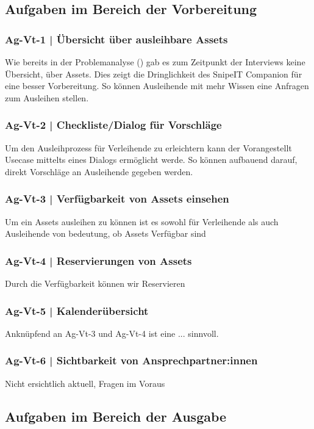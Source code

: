 
\subsection*{Aufgaben im Bereich der Vorbereitung}
\subsubsection*{Ag-Vt-1 | Übersicht über ausleihbare Assets}
Wie bereits in der Problemanalyse () gab es zum Zeitpunkt der Interviews keine Übersicht, über
Assets. Dies zeigt die Dringlichkeit des SnipeIT Companion für eine besser Vorbereitung. So
können Ausleihende mit mehr Wissen eine Anfragen zum Ausleihen stellen. 
\subsubsection*{Ag-Vt-2 | Checkliste/Dialog für Vorschläge}
Um den Ausleihprozess für Verleihende zu erleichtern kann der Vorangestellt Usecase mittelts eines
Dialogs ermöglicht werde. So können aufbauend darauf, direkt Vorschläge an Ausleihende gegeben werden.
\subsubsection*{Ag-Vt-3 | Verfügbarkeit von Assets einsehen}
Um ein Assets ausleihen zu können ist es sowohl für Verleihende als auch Ausleihende von bedeutung, 
ob Assets Verfügbar sind
\subsubsection*{Ag-Vt-4 | Reservierungen von Assets}
Durch die Verfügbarkeit können wir Reservieren
\subsubsection*{Ag-Vt-5 | Kalenderübersicht}
Anknüpfend an Ag-Vt-3 und Ag-Vt-4 ist eine ... sinnvoll.
\subsubsection*{Ag-Vt-6 | Sichtbarkeit von Ansprechpartner:innen}
Nicht ersichtlich aktuell, Fragen im Voraus 

\subsection*{Aufgaben im Bereich der Ausgabe}
